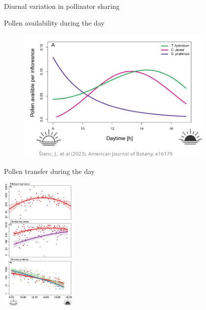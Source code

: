 \documentclass[
  ignorenonframetext,
  aspectratio=169,
]{beamer}
\begin{document}
\begin{frame}{}
\begin{block}{Diurnal variation in pollinator sharing}
\begin{figure}
\end{figure}%
\end{block}

\begin{block}{Pollen availability during the day}
\label{pollen-availability-during-the-day}
\begin{figure}

\begin{minipage}{0.95\linewidth}
\begin{center}
\includegraphics[width=3.78125in,height=\textheight,keepaspectratio]{images/pollen_pres.png}
\end{center}
\end{minipage}%
%
\begin{minipage}{0.05\linewidth}

\end{minipage}%

\end{figure}%
\end{block}

\begin{block}{Pollen transfer during the day}
\label{pollen-transfer-during-the-day}
\begin{center}
\includegraphics[width=1.44792in,height=\textheight,keepaspectratio]{images/pollen_tra.png}
\end{center}
\end{block}


\end{frame}
\end{document}
